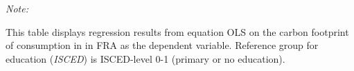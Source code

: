 \begin{table}[htbp!]
\begin{adjustbox}{width = 1\textwidth, max height = 0.95\textheight, center}
\begin{threeparttable}[b]
         \begin{tablenotes}\item \medskip \textit{Note:}
            \item This table displays regression results from equation OLS on the carbon footprint of consumption in  in FRA as the dependent variable.  Reference group for education (\textit{ISCED}) is ISCED-level 0-1 (primary or no education).
         \end{tablenotes}
      \end{threeparttable}
   \end{adjustbox}
\end{table}


